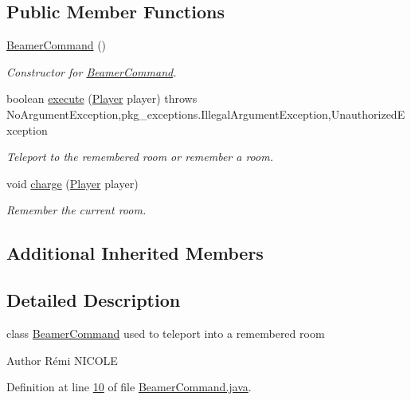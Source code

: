 \subsection*{Public Member Functions}
\begin{DoxyCompactItemize}
\item 
\hyperlink{classpkg__commands_1_1BeamerCommand_a541cd046e7680452f451322c1730e675}{Beamer\-Command} ()
\begin{DoxyCompactList}\small\item\em Constructor for \hyperlink{classpkg__commands_1_1BeamerCommand}{Beamer\-Command}. \end{DoxyCompactList}\item 
boolean \hyperlink{classpkg__commands_1_1BeamerCommand_a139dc852e180cabd8af15cfed37dcf0e}{execute} (\hyperlink{classpkg__world_1_1Player}{Player} player)  throws No\-Argument\-Exception,pkg\-\_\-exceptions.\-Illegal\-Argument\-Exception,\-Unauthorized\-Exception 
\begin{DoxyCompactList}\small\item\em Teleport to the remembered room or remember a room. \end{DoxyCompactList}\item 
void \hyperlink{classpkg__commands_1_1BeamerCommand_ae71665296a18d581ad1f714c1078e37b}{charge} (\hyperlink{classpkg__world_1_1Player}{Player} player)
\begin{DoxyCompactList}\small\item\em Remember the current room. \end{DoxyCompactList}\end{DoxyCompactItemize}
\subsection*{Additional Inherited Members}


\subsection{Detailed Description}
class \hyperlink{classpkg__commands_1_1BeamerCommand}{Beamer\-Command} used to teleport into a remembered room 

\begin{DoxyAuthor}{Author}
Rémi N\-I\-C\-O\-L\-E 
\end{DoxyAuthor}


Definition at line \hyperlink{BeamerCommand_8java_source_l00010}{10} of file \hyperlink{BeamerCommand_8java_source}{Beamer\-Command.\-java}.



